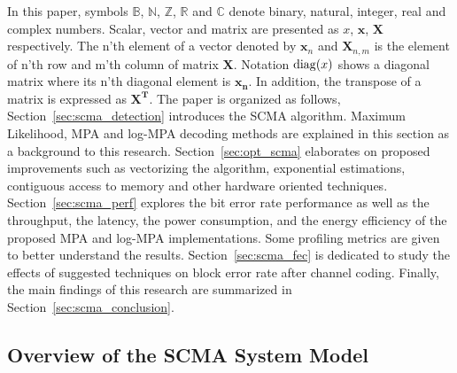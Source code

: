In this paper, symbols $\mathbb{B}$, $\mathbb{N}$, $\mathbb{Z}$, $\mathbb{R}$
and $\mathbb{C}$ denote binary, natural, integer, real and complex numbers.
Scalar, vector and matrix are presented as $x$, $\bm{x}$, $\bm{X}$ respectively.
The n'th element of a vector denoted by $\bm{x}_n$ and $\bm{X}_{n,m}$ is the
element of n'th row and m'th column of matrix $\bm{X}$. Notation $\operatorname{diag}(x)$
shows a diagonal matrix where its n'th diagonal element is $\bm{x_n}$. In
addition, the transpose of a matrix is expressed as $\bm{X^T}$. The paper is
organized as follows, Section~\ref{sec:scma_detection} introduces the SCMA
algorithm. Maximum Likelihood, MPA and log-MPA decoding methods are explained in
this section as a background to this research.
Section~\ref{sec:opt_scma} elaborates on proposed improvements such as
vectorizing the algorithm, exponential estimations, contiguous access to memory
and other hardware oriented techniques. Section~\ref{sec:scma_perf} explores the
bit error rate performance as well as the throughput, the latency, the power
consumption, and the energy efficiency of the proposed MPA and log-MPA
implementations. Some profiling metrics are given to better understand the
results. Section~\ref{sec:scma_fec} is dedicated to study the effects of
suggested techniques on block error rate after channel coding. Finally, the main
findings of this research are summarized in Section~\ref{sec:scma_conclusion}.

\subsection{Overview of the SCMA System Model}
\label{sec:scma_overview}

